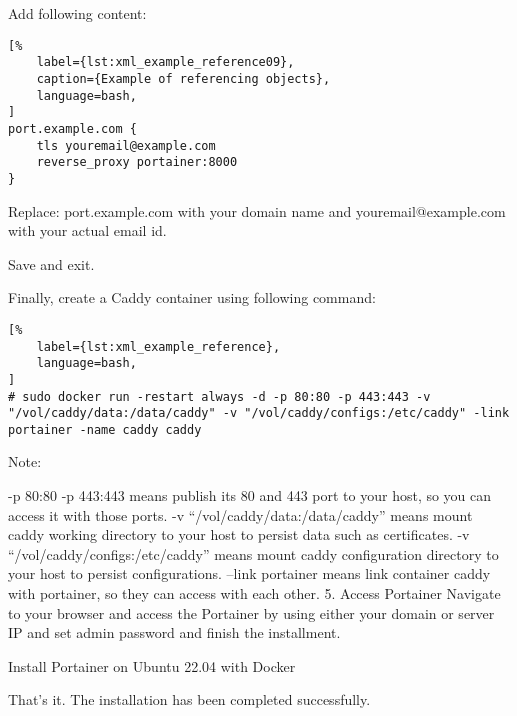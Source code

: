 \documentclass[%
	a4paper,
	oneside,
	listof=numbered,
	parskip=half,
	headsepline=true,
	footsepline=false,
	0.7headlines,
	]{scrbook}
\begin{document}
Add following content:

\begin{lstlisting}[%
	label={lst:xml_example_reference09},
	caption={Example of referencing objects},
	language=bash,
]
port.example.com {
	tls youremail@example.com
	reverse_proxy portainer:8000
}
\end{lstlisting}


Replace: port.example.com with your domain name and youremail@example.com with your actual email id.

Save and exit.

Finally, create a Caddy container using following command:

\begin{lstlisting}[%
	label={lst:xml_example_reference},
	language=bash,
]
# sudo docker run -restart always -d -p 80:80 -p 443:443 -v "/vol/caddy/data:/data/caddy" -v "/vol/caddy/configs:/etc/caddy" -link portainer -name caddy caddy
\end{lstlisting}

Note:

-p 80:80 -p 443:443 means publish its 80 and 443 port to your host, so you can access it with those ports.
-v “/vol/caddy/data:/data/caddy” means mount caddy working directory to your host to persist data such as certificates.
-v “/vol/caddy/configs:/etc/caddy” means mount caddy configuration directory to your host to persist configurations.
–link portainer means link container caddy with portainer, so they can access with each other.
5.
Access Portainer
Navigate to your browser and access the Portainer by using either your domain or server IP and set admin password and finish the installment.



Install Portainer on Ubuntu 22.04 with Docker

That’s it.
The installation has been completed successfully.

\listoffigures
\lstlistoflistings

%
%
\end{document}
